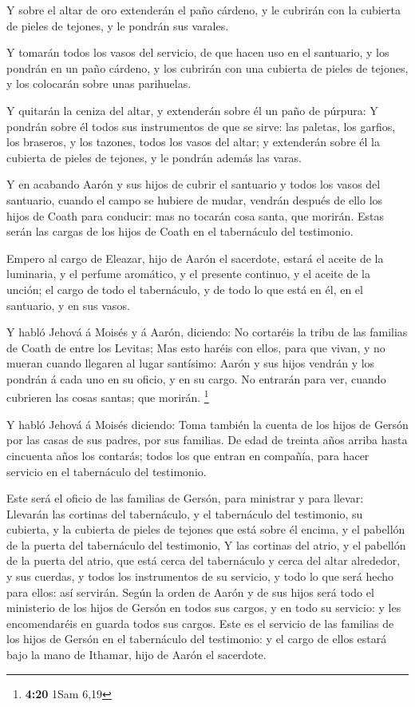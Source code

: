  Y sobre el altar de oro extenderán el paño cárdeno, y le
cubrirán con la cubierta de pieles de tejones, y le pondrán sus varales.

 Y tomarán todos los vasos del servicio, de que hacen uso
en el santuario, y los pondrán en un paño cárdeno, y los cubrirán con
una cubierta de pieles de tejones, y los colocarán sobre unas
parihuelas.

 Y quitarán la ceniza del altar, y extenderán sobre él un
paño de púrpura:  Y pondrán sobre él todos sus instrumentos
de que se sirve: las paletas, los garfios, los braseros, y los tazones,
todos los vasos del altar; y extenderán sobre él la cubierta de pieles
de tejones, y le pondrán además las varas.

 Y en acabando Aarón y sus hijos de cubrir el santuario y
todos los vasos del santuario, cuando el campo se hubiere de mudar,
vendrán después de ello los hijos de Coath para conducir: mas no tocarán
cosa santa, que morirán. Estas serán las cargas de los hijos de Coath en
el tabernáculo del testimonio.

 Empero al cargo de Eleazar, hijo de Aarón el sacerdote,
estará el aceite de la luminaria, y el perfume aromático, y el presente
continuo, y el aceite de la unción; el cargo de todo el tabernáculo, y
de todo lo que está en él, en el santuario, y en sus vasos.

 Y habló Jehová á Moisés y á Aarón, diciendo: 
No cortaréis la tribu de las familias de Coath de entre los Levitas;
 Mas esto haréis con ellos, para que vivan, y no mueran
cuando llegaren al lugar santísimo: Aarón y sus hijos vendrán y los
pondrán á cada uno en su oficio, y en su cargo.  No
entrarán para ver, cuando cubrieren las cosas santas; que morirán.
\footnote{\textbf{4:20} 1Sam 6,19}

 Y habló Jehová á Moisés diciendo:  Toma
también la cuenta de los hijos de Gersón por las casas de sus padres,
por sus familias.  De edad de treinta años arriba hasta
cincuenta años los contarás; todos los que entran en compañía, para
hacer servicio en el tabernáculo del testimonio.

 Este será el oficio de las familias de Gersón, para
ministrar y para llevar:  Llevarán las cortinas del
tabernáculo, y el tabernáculo del testimonio, su cubierta, y la cubierta
de pieles de tejones que está sobre él encima, y el pabellón de la
puerta del tabernáculo del testimonio,  Y las cortinas del
atrio, y el pabellón de la puerta del atrio, que está cerca del
tabernáculo y cerca del altar alrededor, y sus cuerdas, y todos los
instrumentos de su servicio, y todo lo que será hecho para ellos: así
servirán.  Según la orden de Aarón y de sus hijos será todo
el ministerio de los hijos de Gersón en todos sus cargos, y en todo su
servicio: y les encomendaréis en guarda todos sus cargos. 
Este es el servicio de las familias de los hijos de Gersón en el
tabernáculo del testimonio: y el cargo de ellos estará bajo la mano de
Ithamar, hijo de Aarón el sacerdote.

